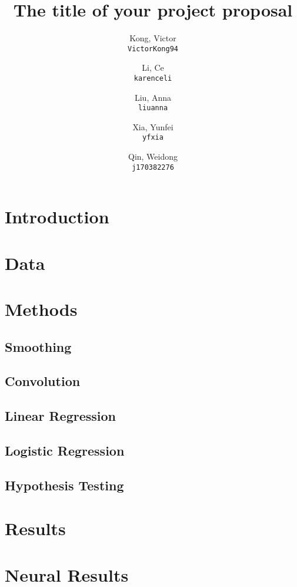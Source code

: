 \documentclass[11pt]{article}
\title{The title of your project proposal}
\author{
  Kong, Victor\\
  \texttt{VictorKong94}
  \and
  Li, Ce\\
  \texttt{karenceli}
  \and
  Liu, Anna\\
  \texttt{liuanna}
  \and
  Xia, Yunfei\\
  \texttt{yfxia}
  \and
  Qin, Weidong\\
  \texttt{j170382276}
}
\begin{document}
\maketitle

\abstract{}

\section{Introduction}
        

\section{Data}
        

\section{Methods}

    \subsection{Smoothing}
            
    \subsection{Convolution}
            
    \subsection{Linear Regression}
            
    \subsection{Logistic Regression}
                
    \subsection{Hypothesis Testing}
                
\section{Results}

    \section{Neural Results}
            
\end{document}
